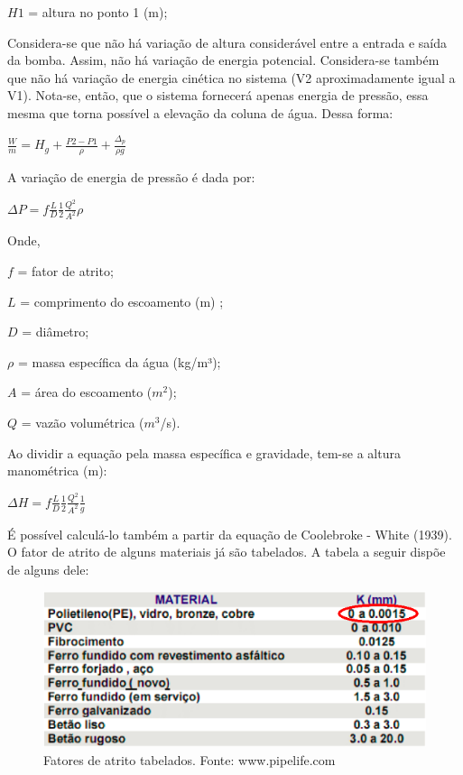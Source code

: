 $H1$ = altura no ponto 1 (m);

Considera-se que não há variação de altura considerável entre a entrada e saída da bomba. Assim, não há variação de energia potencial. Considera-se também que não há variação de energia cinética no sistema (V2 aproximadamente igual a V1). Nota-se, então, que o sistema fornecerá apenas energia de pressão, essa mesma que torna possível a elevação da coluna de água. Dessa forma:

\begin{center}
	\large
	${\displaystyle \frac{W}{m} = H_g + \frac{P2-P1}{\rho}+ \frac{\Delta_p}{\rho g}}$
\end{center}

A variação de energia de pressão é dada por: 

\begin{center}
	\large
	${\displaystyle \Delta P = f \frac{L}{D} \frac{1}{2} \frac{Q^2}{A^2} \rho}$
\end{center}

Onde,

$f$ = fator de atrito;

$L$ = comprimento do escoamento (m) ;

$D$ = diâmetro;

$\rho$ = massa específica da água (kg/m³);

$A$ = área do escoamento ($m^2$);

$Q$ = vazão volumétrica ($m^3$/s).

Ao dividir a equação pela massa específica e gravidade, tem-se a altura manométrica (m):

\begin{center}
	\large
	${\displaystyle \Delta H = f \frac{L}{D} \frac{1}{2} \frac{Q^2}{A^2} \frac{1}{g}}$
\end{center}

É possível calculá-lo também a partir da equação de Coolebroke - White (1939). O fator de atrito de alguns materiais já são tabelados. A tabela a seguir dispõe de alguns dele:

\begin{figure}[H]
	\centering
	\includegraphics[width=13cm]{figuras/fatores_atrito.png}
	\caption{Fatores de atrito tabelados. Fonte: www.pipelife.com}
	\label{fatores_atrito}
\end{figure}

